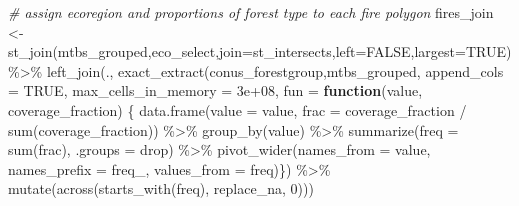 \documentclass[
]{book}
\newenvironment{Shaded}{\begin{snugshade}}{\end{snugshade}}
\newcommand{\AttributeTok}[1]{\textcolor[rgb]{0.77,0.63,0.00}{#1}}
\newcommand{\CommentTok}[1]{\textcolor[rgb]{0.56,0.35,0.01}{\textit{#1}}}
\newcommand{\ConstantTok}[1]{\textcolor[rgb]{0.00,0.00,0.00}{#1}}
\newcommand{\ControlFlowTok}[1]{\textcolor[rgb]{0.13,0.29,0.53}{\textbf{#1}}}
\newcommand{\DecValTok}[1]{\textcolor[rgb]{0.00,0.00,0.81}{#1}}
\newcommand{\FloatTok}[1]{\textcolor[rgb]{0.00,0.00,0.81}{#1}}
\newcommand{\FunctionTok}[1]{\textcolor[rgb]{0.00,0.00,0.00}{#1}}
\newcommand{\NormalTok}[1]{#1}
\newcommand{\OtherTok}[1]{\textcolor[rgb]{0.56,0.35,0.01}{#1}}
\newcommand{\SpecialCharTok}[1]{\textcolor[rgb]{0.00,0.00,0.00}{#1}}
\newcommand{\StringTok}[1]{\textcolor[rgb]{0.31,0.60,0.02}{#1}}
\begin{document}
\begin{Shaded}
\begin{Highlighting}[]
\CommentTok{\# assign ecoregion and proportions of forest type to each fire polygon}
\NormalTok{fires\_join }\OtherTok{\textless{}{-}} \FunctionTok{st\_join}\NormalTok{(mtbs\_grouped,eco\_select,}\AttributeTok{join=}\NormalTok{st\_intersects,}\AttributeTok{left=}\ConstantTok{FALSE}\NormalTok{,}\AttributeTok{largest=}\ConstantTok{TRUE}\NormalTok{) }\SpecialCharTok{\%\textgreater{}\%} 
  \FunctionTok{left\_join}\NormalTok{(., }\FunctionTok{exact\_extract}\NormalTok{(conus\_forestgroup,mtbs\_grouped, }\AttributeTok{append\_cols =} \ConstantTok{TRUE}\NormalTok{, }\AttributeTok{max\_cells\_in\_memory =} \FloatTok{3e+08}\NormalTok{, }
                             \AttributeTok{fun =} \ControlFlowTok{function}\NormalTok{(value, coverage\_fraction) \{}
                               \FunctionTok{data.frame}\NormalTok{(}\AttributeTok{value =}\NormalTok{ value,}
                                          \AttributeTok{frac =}\NormalTok{ coverage\_fraction }\SpecialCharTok{/} \FunctionTok{sum}\NormalTok{(coverage\_fraction)) }\SpecialCharTok{\%\textgreater{}\%}
                                 \FunctionTok{group\_by}\NormalTok{(value) }\SpecialCharTok{\%\textgreater{}\%}
                                 \FunctionTok{summarize}\NormalTok{(}\AttributeTok{freq =} \FunctionTok{sum}\NormalTok{(frac), }\AttributeTok{.groups =} \StringTok{\textquotesingle{}drop\textquotesingle{}}\NormalTok{) }\SpecialCharTok{\%\textgreater{}\%}
                                 \FunctionTok{pivot\_wider}\NormalTok{(}\AttributeTok{names\_from =} \StringTok{\textquotesingle{}value\textquotesingle{}}\NormalTok{,}
                                             \AttributeTok{names\_prefix =} \StringTok{\textquotesingle{}freq\_\textquotesingle{}}\NormalTok{,}
                                             \AttributeTok{values\_from =} \StringTok{\textquotesingle{}freq\textquotesingle{}}\NormalTok{)\}) }\SpecialCharTok{\%\textgreater{}\%}
              \FunctionTok{mutate}\NormalTok{(}\FunctionTok{across}\NormalTok{(}\FunctionTok{starts\_with}\NormalTok{(}\StringTok{\textquotesingle{}freq\textquotesingle{}}\NormalTok{), replace\_na, }\DecValTok{0}\NormalTok{)))}
 

\end{Highlighting}
\end{Shaded}
\end{document}
